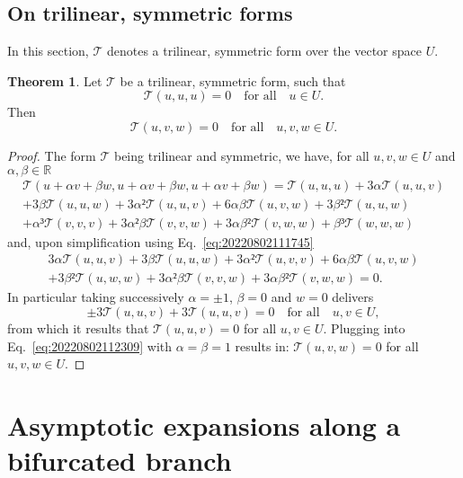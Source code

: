\documentclass[12pt, final]{scrartcl}
\theoremstyle{definition}
\newtheorem{theorem}{Theorem}
\begin{document}
\subsection{On trilinear, symmetric forms}

In this section, \(𝒯\) denotes a trilinear, symmetric form over the vector space
\(U\).

\begin{theorem}
  \label{thr:20220802112835}
  Let \(𝒯\) be a trilinear, symmetric form, such that
  \begin{equation}
    \label{eq:20220802111745}
    𝒯(u, u, u) = 0 \quad \text{for all} \quad u ∈ U.
  \end{equation}
  Then
  \begin{equation}
    𝒯(u, v, w) = 0 \quad \text{for all} \quad u, v, w ∈ U.
  \end{equation}
\end{theorem}
\begin{proof}
  The form \(𝒯\) being trilinear and symmetric, we have, for all \(u, v, w ∈ U\)
  and \(α, β ∈ ℝ\)
  \begin{multline*}
    𝒯(u + αv + βw, u + αv + βw, u + αv + βw) = 𝒯(u, u, u) + 3α 𝒯(u, u, v)\\
    + 3β 𝒯(u, u, w) + 3α² 𝒯(u, u, v) + 6 α β 𝒯(u, v, w) + 3 β² 𝒯(u, u, w)\\
    + α³ 𝒯(v, v, v) + 3 α² β 𝒯(v, v, w) + 3 α β² 𝒯(v, w, w) + β³ 𝒯(w, w, w)
  \end{multline*}
  and, upon simplification using Eq.~\eqref{eq:20220802111745}
  \begin{multline}
    \label{eq:20220802112309}
    3α 𝒯(u, u, v) + 3β 𝒯(u, u, w) + 3α² 𝒯(u, v, v) + 6 α β 𝒯(u, v, w)\\
    + 3 β² 𝒯(u, w, w) + 3 α² β 𝒯(v, v, w) + 3 α β² 𝒯(v, w, w) = 0.
  \end{multline}
  In particular taking successively \(α = ±1\), \(β = 0\) and \(w = 0\) delivers
  \begin{equation*}
    ±3 𝒯(u, u, v) + 3 𝒯(u, u, v) = 0 \quad \text{for all} \quad u, v ∈ U,
  \end{equation*}
  from which it results that \(𝒯(u, u, v) = 0\) for all \(u, v ∈ U\). Plugging
  into Eq.~\eqref{eq:20220802112309} with \(α = β = 1\) results in:
  \(𝒯(u, v, w) = 0\) for all \(u, v, w ∈ U\).
\end{proof}

\section{Asymptotic expansions along a bifurcated branch}
\label{sec:20220905060440}
\end{document}
